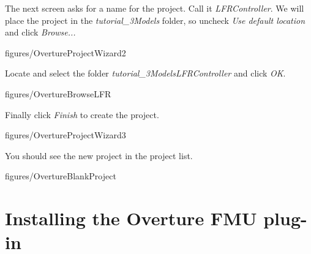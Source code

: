 \documentclass[11pt,a4paper]{../tutorial}
\begin{document}
\begin{instructions}
\item The next screen asks for a name for the project. Call it \emph{LFRController}. We will place the project in the \emph{tutorial\_3\pathsep{}Models} folder, so uncheck \emph{Use default location} and click \emph{Browse...}

    \begin{annotation}[width=0.6\linewidth]{figures/OvertureProjectWizard2}
    \end{annotation}

\newpage
\item Locate and select the folder \emph{tutorial\_3\pathsep{}Models\pathsep{}LFRController} and click \emph{OK}.

    \begin{annotation}[width=0.55\linewidth]{figures/OvertureBrowseLFR}
    \end{annotation}

\item Finally click \emph{Finish} to create the project.

    \begin{annotation}[width=0.6\linewidth]{figures/OvertureProjectWizard3}
    \end{annotation}

    You should see the new project in the project list.

    \begin{annotation}[width=\linewidth,trim=0 400 0 0,clip]{figures/OvertureBlankProject}
    \end{annotation}

\end{instructions}


\section{Installing the Overture FMU plug-in}
\end{document}

